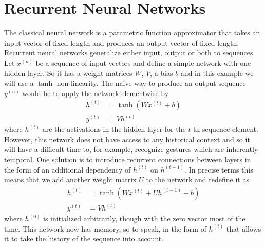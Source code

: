 \section{Recurrent Neural Networks}
\label{sec:rnns}

The classical neural network is a parametric function approximator that takes an
input vector of fixed length and produces an output vector of fixed length.
Recurrent neural networks generalize either input, output or both to sequences.
Let $x^{(n)}$ be a sequence of input vectors and define a simple network with
one hidden layer. So it has a weight matrices $W$, $V$, a bias $b$ and in this
example we will use a $\tanh$ non-linearity. The naive way to produce an output
sequence $y^{(n)}$ would be to apply the network elementwise by
\begin{align*}
  h^{(t)} & = \tanh\left( Wx^{(t)} + b \right)\\
  y^{(t)} & = Vh^{(t)}
\end{align*}
where $h^{(t)}$ are the activations in the hidden layer for the $t$-th sequence
element. However, this network does not have access to any historical context
and so it will have a difficult time to, for example, recognize gestures which
are inherently temporal. One solution is to introduce recurrent connections
between layers in the form of an additional dependency of $h^{(t)}$ on $h^{(t -
  1)}$. In precise terms this means that we add another weight matrix $U$ to the
network and redefine it as
\begin{align*}
  h^{(t)} & = \tanh\left( Wx^{(t)} + Uh^{(t - 1)} + b \right)\\
  y^{(t)} & = Vh^{(t)}
\end{align*}
where $h^{(0)}$ is initialized arbitrarily, though with the zero vector most of
the time. This network now has memory, so to speak, in the form of $h^{(t)}$
that allows it to take the history of the sequence into account.

